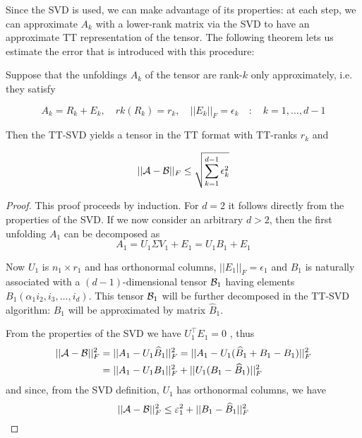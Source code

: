 Since the SVD is used, we can make advantage of its properties: at each step, we can approximate $A_k$ with a lower-rank matrix via the SVD to have an approximate TT representation of the tensor. The following theorem lets us estimate the error that is introduced with this procedure:

\begin{Teo} \label{teo:ttsvd_approx}
  Suppose that the unfoldings $A_k$ of the tensor \A are rank-$k$ only approximately, i.e. they satisfy

  \begin{equation} \label{teo:ttsvd_approx:ip:1}
  A_k = R_k + E_k, \quad rk(R_k) = r_k, \quad ||E_k||_F = \epsilon_k \quad:\quad k = 1,\ldots,d-1
  \end{equation}

  Then the TT-SVD yields a tensor \B in the TT format with TT-ranks $r_k$ and

  \begin{equation}
    ||\mathcal{A} - \mathcal{B} ||_F \le \sqrt{\sum_{k=1}^{d-1} \epsilon_k^2}
  \end{equation}
  
  \begin{proof}
    This proof proceeds by induction. For $d=2$ it follows directly from the properties of the SVD. If we now consider an arbitrary $d > 2$, then the first unfolding $A_1$ can be decomposed as
    \[
    A_1 = U_1 \Sigma V_1 + E_1 = U_1 B_1 + E_1
    \]

    Now $U_1$ is $n_1 \times r_1$ and has orthonormal columns, $||E_1||_F = \epsilon_1$ and $B_1$ is naturally associated with a $(d-1)$-dimensional tensor $\mathcal{B}_1$ having elements $B_1(\alpha_1i_2,i_3,\ldots,i_d)$. This tensor $\mathcal{B}_1$ will be further decomposed in the TT-SVD algorithm: $B_1$ will be approximated by matrix $\hat{B}_1$.

    From the properties of the SVD we have $U_1^\top E_1 = 0$  , thus
    \begin{equation*}
      \begin{split}
        ||\mathcal{A}-\mathcal{B}||_F^2 &= ||A_1 - U_1\widehat{B}_1||_F^2 = ||A_1 - U_1(\widehat{B}_1 + B_1 - B_1)||_F^2 \\
         &= ||A_1 - U_1 B_1||_F^2 + ||U_1(B_1 - \widehat{B}_1)||_F^2
      \end{split}
    \end{equation*}
    and since, from the SVD definition, $U_1$ has orthonormal columns, we have
    \begin{equation} \label{teo:ttsvd_approx:proof:bound}
      ||\mathcal{A} - \mathcal{B}||_F^2 \le \varepsilon_1^2 + ||B_1 - \widehat{B}_1 ||_F^2
    \end{equation}


\end{proof}
\end{Teo}
